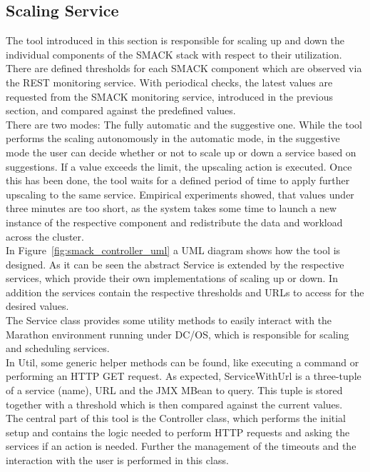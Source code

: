 \subsection{Scaling Service}
The tool introduced in this section is responsible for scaling up and down the individual components of the SMACK stack with respect to their utilization.\\
There are defined thresholds for each SMACK component which are observed via the REST monitoring service.
With periodical checks, the latest values are requested from the SMACK monitoring service, introduced in the previous section, and compared against the predefined values.\\
There are two modes: The fully automatic and the suggestive one.
While the tool performs the scaling autonomously in the automatic mode, in the suggestive mode the user can decide whether or not to scale up or down a service based on suggestions.
If a value exceeds the limit, the upscaling action is executed.
Once this has been done, the tool waits for a defined period of time to apply further upscaling to the same service.
Empirical experiments showed, that values under three minutes are too short, as the system takes some time to launch a new instance of the respective component and redistribute the data and workload across the cluster.\\

In Figure~\ref{fig:smack_controller_uml} a UML diagram shows how the tool is designed.
As it can be seen the abstract Service is extended by the respective services, which provide their own implementations of scaling up or down.
In addition the services contain the respective thresholds and URLs to access for the desired values.\\
The Service class provides some utility methods to easily interact with the Marathon environment running under DC/OS, which is responsible for scaling and scheduling services.\\
In Util, some generic helper methods can be found, like executing a command or performing an HTTP GET request.
As expected, ServiceWithUrl is a three-tuple of a service (name), URL and the JMX MBean to query.
This tuple is stored together with a threshold which is then compared against the current values.\\
The central part of this tool is the Controller class, which performs the initial setup and contains the logic needed to perform HTTP requests and asking the services if an action is needed.
Further the management of the timeouts and the interaction with the user is performed in this class.\\


